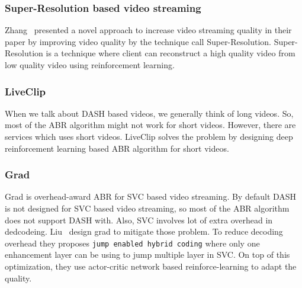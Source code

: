 \subsubsection{Super-Resolution based video streaming}
Zhang \etal\ presented a novel approach to increase video streaming quality in their paper \cite{9155384} by improving video quality by the technique call Super-Resolution. Super-Resolution is a technique where client can reconstruct a high quality video from low quality video using reinforcement learning.

\subsubsection{LiveClip}
When we talk about DASH based videos, we generally think of long videos. So, most of the ABR algorithm might not work for short videos. However, there are services which uses short videos. LiveClip\cite{10.1145/3386290.3396937} solves the problem by designing deep reinforcement learning based ABR algorithm for short videos.

\subsubsection{Grad}
Grad\cite{10.1145/3394171.3413512} is overhead-award ABR for SVC based video streaming. By default DASH is not designed for SVC based video streaming, so most of the ABR algorithm does not support DASH with. Also, SVC involves lot of extra overhead in dedcodeing. Liu \etal\ design grad to mitigate those problem. To reduce decoding overhead they proposes {\tt jump enabled hybrid coding} where only one enhancement layer can be using to jump multiple layer in SVC. On top of this optimization, they use actor-critic network based reinforce-learning to adapt the quality.